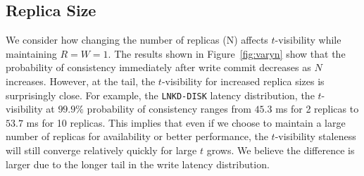 \documentclass{vldb}
\begin{document}
\subsection{Replica Size}

We consider how changing the number of replicas (N) affects
$t$-visibility while maintaining $R$$=$$W$$=$$1$. The results shown in
Figure~\ref{fig:varyn} show that the probability of consistency
immediately after write commit decreases as $N$ increases.  However,
at the tail, the $t$-visibility for increased replica sizes is
surprisingly close.  For example, the \texttt{LNKD-DISK} latency
distribution, the $t$-visibility at $99.9\%$ probability of
consistency ranges from $45.3$ ms for 2 replicas to $53.7$ ms for 10
replicas.  This implies that even if we choose to maintain a large
number of replicas for availability or better performance, the
$t$-visibility staleness will still converge relatively quickly for large $t$
grows. We believe the difference is larger due to the longer tail in
the write latency distribution.
\end{document}
